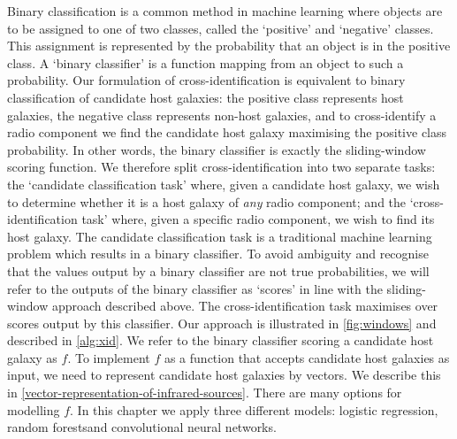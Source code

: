 \documentclass[11pt, a4paper]{book}
\providecommand{\DIFaddtex}[1]{{\protect\color{blue}\uwave{#1}}} %
\providecommand{\DIFaddbegin}{} %
\providecommand{\DIFaddend}{} %
\providecommand{\DIFadd}[1]{\texorpdfstring{\DIFaddtex{#1}}{#1}} %
\newcommand{\DIFaddincludegraphics}[2][]{{\color{blue}\fbox{\DIFOincludegraphics[#1]{#2}}}} %
\DeclareRobustCommand{\DIFaddbegin}{\DIFOaddbegin \let\includegraphics\DIFaddincludegraphics} %
\DeclareRobustCommand{\DIFaddend}{\DIFOaddend \let\includegraphics\DIFOincludegraphics} %
\begin{document}
    {Binary classification is a common method in machine learning
    where objects are to be assigned to one of two classes,
    called the `positive' and `negative' classes. This assignment is
    represented by the probability that an object is in the positive class. A
    `binary classifier' is a function mapping from an object to such a
    probability. Our formulation of cross-identification is equivalent to
    binary classification of candidate host galaxies: the positive class
    represents host galaxies, the negative class represents non-host galaxies,
    and to cross-identify a radio component we find the candidate host galaxy
    maximising the positive class probability. In other words,
    the binary classifier is exactly the sliding-window scoring function. We therefore split
    cross-identification into two separate tasks: the `candidate
    classification task' where, given a candidate host galaxy, we wish to
    determine whether it is a host galaxy of \emph{any} radio component; and
    the `cross-identification task' where, given a specific radio
    component, we wish to find its host galaxy. The candidate classification task
    is a traditional machine learning problem which results in a binary
    classifier. To avoid ambiguity and recognise that the values output by a
    binary classifier are not true probabilities, we will refer to the outputs
    of the binary classifier as `scores' in line with the sliding-window approach
    described above. The cross-identification task maximises over scores
    output by this classifier. Our approach is illustrated in
    \autoref{fig:windows} and described in \autoref{alg:xid}. We refer to the
    binary classifier scoring a candidate host galaxy as
    $f$. To implement $f$ as a function that accepts candidate host galaxies
    as input, we need to represent candidate host galaxies by vectors. We
    describe this in \autoref{vector-representation-of-infrared-sources}.
    There are many options for modelling $f$. In this chapter we apply three
    different models: logistic regression, random forests\DIFaddbegin \DIFadd{, }\DIFaddend and convolutional
    neural networks.}
\end{document}
